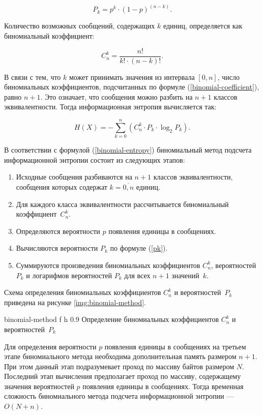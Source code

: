 \begin{equation}\label{pk}
	P_{k} = p^k \cdot (1 - p)^{(n - k)}.
\end{equation} 

Количество возможных сообщений, содержащих $k$ единиц, определяется как биномиальный коэффициент:

\begin{equation}\label{binomial-coefficient}
	C_{n}^k = \frac{n!}{k! \cdot (n - k)!}.
\end{equation}

В связи с тем, что $k$ может принимать значения из интервала $[0, n]$, число биномиальных коэффициентов, подсчитанных по формуле (\ref{binomial-coefficient}), равно $n + 1$. Это означает, что сообщения можно разбить на $n + 1$ классов эквивалентности. Тогда информационная энтропия вычисляется так:

\begin{equation}\label{binomial-entropy}
	H(X) = -\sum_{k = 0}^n (C_{n}^k \cdot P_{k} \cdot \log_{2}P_{k}).
\end{equation}

В соответствии с формулой (\ref{binomial-entropy}) биномиальный метод подсчета информационной энтропии состоит из следующих этапов:

\begin{enumerate}
	\item Исходные сообщения разбиваются на $n + 1$ классов эквивалентности, сообщения которых содержат $k = \overline{0, n}$ единиц.
	\item Для каждого класса эквивалентности рассчитывается биномиальный коэффициент~$C_{n}^k$.
	\item Определяются вероятности $p$ появления единицы в сообщениях.
	\item Вычисляются вероятности $P_{k}$ по формуле (\ref{pk}).
	\item Суммируются произведения биномиальных коэффициентов $C_{n}^k$, вероятностей $P_{k}$ и логарифмов вероятностей $P_{k}$ для всех $n + 1$ значений~$k$.
\end{enumerate}

Схема определения биномиальных коэффициентов $C_{n}^k$ и вероятностей~$P_{k}$ приведена на рисунке \ref{img:binomial-method}.

    {binomial-method}
    {f}
    {h}
    {0.9\textwidth}
    {Определение биномиальных коэффициентов $C_{n}^k$ и вероятностей~$P_{k}$}

Для определения вероятности $p$ появления единицы в сообщениях на третьем этапе биномиального метода необходима дополнительная память размером $n + 1$. При этом данный этап подразумевает проход по массиву байтов размером $N$. Последний этап вычисления предполагает проход по массиву, содержащему значения вероятностей $p$ появления единицы в сообщениях. Тогда временная сложность биномиального метода подсчета информационной энтропии --- $O(N + n)$.

